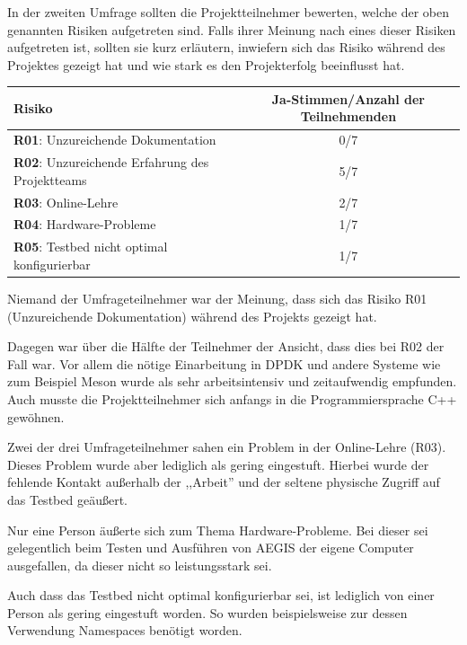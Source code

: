 \documentclass[../review_3.tex]{subfiles}
\begin{document}
In der zweiten Umfrage sollten die Projektteilnehmer bewerten, welche der oben genannten Risiken aufgetreten sind. Falls ihrer Meinung nach eines dieser Risiken aufgetreten ist, sollten sie kurz erläutern, inwiefern sich das Risiko während des Projektes gezeigt hat und wie stark es den Projekterfolg beeinflusst hat.

\begin{longtable}[h]{l c}
    \toprule
    \textbf{Risiko}                                        & \textbf{Ja-Stimmen/Anzahl der Teilnehmenden} \\ \midrule \endhead
    \textbf{R01}: Unzureichende Dokumentation              & 0/7                                          \\
    \textbf{R02}: Unzureichende Erfahrung des Projektteams & 5/7                                          \\
    \textbf{R03}: Online-Lehre                             & 2/7                                          \\
    \textbf{R04}: Hardware-Probleme                        & 1/7                                          \\
    \textbf{R05}: Testbed nicht optimal konfigurierbar     & 1/7                                          \\ \bottomrule
\end{longtable}
Niemand der Umfrageteilnehmer war der Meinung, dass sich das Risiko R01 (Unzureichende Dokumentation) während des Projekts gezeigt hat.

Dagegen war über die Hälfte der Teilnehmer der Ansicht, dass dies bei R02 der Fall war. Vor allem die nötige Einarbeitung in DPDK und andere Systeme wie zum Beispiel Meson wurde als sehr arbeitsintensiv und zeitaufwendig empfunden. Auch musste die Projektteilnehmer sich anfangs in die Programmiersprache C++ gewöhnen.

Zwei der drei Umfrageteilnehmer sahen ein Problem in der Online-Lehre (R03).  Dieses Problem wurde aber lediglich als gering eingestuft. Hierbei wurde der fehlende Kontakt außerhalb der ,,Arbeit'' und der seltene physische Zugriff auf das Testbed geäußert.

Nur eine Person äußerte sich zum Thema Hardware-Probleme. Bei dieser sei gelegentlich beim Testen und Ausführen von AEGIS der eigene Computer ausgefallen, da dieser nicht so leistungsstark sei.

Auch dass das Testbed nicht optimal konfigurierbar sei, ist lediglich von einer Person als gering eingestuft worden. So wurden beispielsweise zur dessen Verwendung Namespaces benötigt worden.
\end{document}
